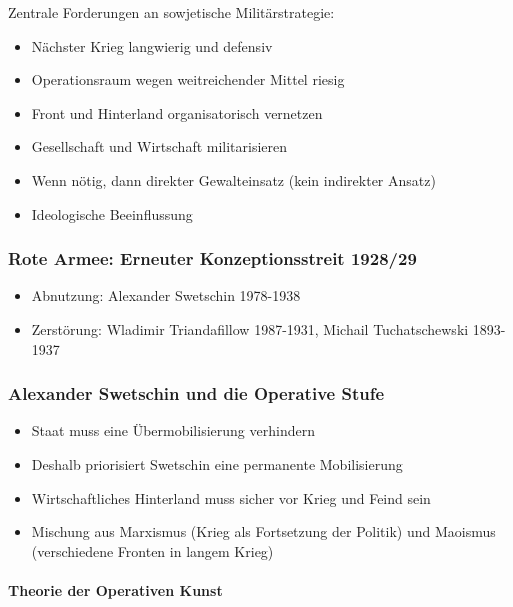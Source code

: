 {}\documentclass[a4paper]{article}
\providecommand{\tightlist}{\setlength{\itemsep}{1mm}\setlength{\parskip}{1mm}}
\begin{document}
Zentrale Forderungen an sowjetische Militärstrategie:

\begin{itemize}
	\tightlist
	\item
	      Nächster Krieg langwierig und defensiv
	\item
	      Operationsraum wegen weitreichender Mittel riesig
	\item
	      Front und Hinterland organisatorisch vernetzen
	\item
	      Gesellschaft und Wirtschaft militarisieren
	\item
	      Wenn nötig, dann direkter Gewalteinsatz (kein indirekter Ansatz)
	\item
	      Ideologische Beeinflussung
\end{itemize}

\subsubsection{Rote Armee: Erneuter Konzeptionsstreit
	1928/29}\label{rote-armee-erneuter-konzeptionsstreit-192829}

\begin{itemize}
	\tightlist
	\item
	      Abnutzung: Alexander Swetschin 1978-1938
	\item
	      Zerstörung: Wladimir Triandafillow 1987-1931, Michail Tuchatschewski
	      1893-1937
\end{itemize}

\subsubsection{Alexander Swetschin und die Operative
	Stufe}\label{alexander-swetschin-und-die-operative-stufe}

\begin{itemize}
	\tightlist
	\item
	      Staat muss eine Übermobilisierung verhindern
	\item
	      Deshalb priorisiert Swetschin eine permanente Mobilisierung
	\item
	      Wirtschaftliches Hinterland muss sicher vor Krieg und Feind sein
	\item
	      Mischung aus Marxismus (Krieg als Fortsetzung der Politik) und
	      Maoismus (verschiedene Fronten in langem Krieg)
\end{itemize}

\paragraph{Theorie der Operativen
	Kunst}\label{theorie-der-operativen-kunst}
\end{document}
